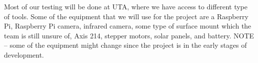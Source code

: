Most of our testing will be done at UTA, where we have access to different type of tools. Some of the equipment that we will use for the project are a Raspberry Pi, Raspberry Pi camera, infrared camera, some type of surface mount which the team is still unsure of, Axis 214, stepper motors, solar panels, and battery. NOTE – some of the equipment might change since the project is in the early stages of development.
